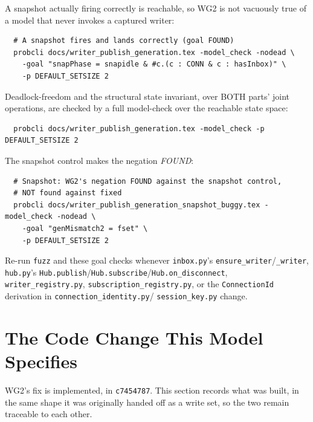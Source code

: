 \documentclass[a4paper,10pt,fleqn]{article}
\begin{document}
A snapshot actually firing correctly is reachable, so WG2 is not vacuously
true of a model that never invokes a captured writer:

\begin{verbatim}
  # A snapshot fires and lands correctly (goal FOUND)
  probcli docs/writer_publish_generation.tex -model_check -nodead \
    -goal "snapPhase = snapidle & #c.(c : CONN & c : hasInbox)" \
    -p DEFAULT_SETSIZE 2
\end{verbatim}

Deadlock-freedom and the structural state invariant, over BOTH parts' joint
operations, are checked by a full model-check over the reachable state
space:

\begin{verbatim}
  probcli docs/writer_publish_generation.tex -model_check -p DEFAULT_SETSIZE 2
\end{verbatim}

The snapshot control makes the negation \emph{FOUND}:

\begin{verbatim}
  # Snapshot: WG2's negation FOUND against the snapshot control,
  # NOT found against fixed
  probcli docs/writer_publish_generation_snapshot_buggy.tex -model_check -nodead \
    -goal "genMismatch2 = fset" \
    -p DEFAULT_SETSIZE 2
\end{verbatim}

Re-run \texttt{fuzz} and these goal checks whenever \texttt{inbox.py}'s
\texttt{ensure\_writer}/\texttt{\_writer}, \texttt{hub.py}'s
\texttt{Hub.publish}/\texttt{Hub.subscribe}/\texttt{Hub.on\_disconnect},
\texttt{writer\_registry.py}, \texttt{subscription\_registry.py}, or the
\texttt{ConnectionId} derivation in \texttt{connection\_identity.py}/
\texttt{session\_key.py} change.

\section{The Code Change This Model Specifies}
\label{sec:codechange}

WG2's fix is implemented, in \texttt{c7454787}. This section records what
was built, in the same shape it was originally handed off as a write set,
so the two remain traceable to each other.
\end{document}

